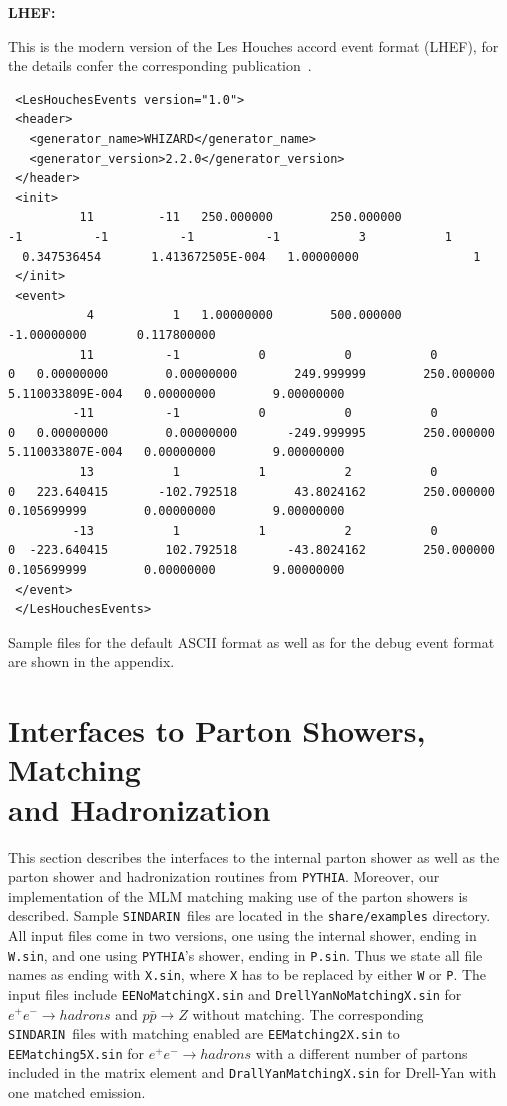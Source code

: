 \documentclass[12pt]{book}
\newcommand{\ttt}[1]{\texttt{#1}}
\newcommand{\pythia}{\texttt{PYTHIA}}
\newcommand{\sindarin}{\texttt{SINDARIN}}
\begin{document}
{\bf LHEF:}

This is the modern version of the Les Houches accord event format
(LHEF), for the details confer the corresponding publication~\cite{LHEF}.

\begin{scriptsize}
  \begin{verbatim}
 <LesHouchesEvents version="1.0">
 <header>
   <generator_name>WHIZARD</generator_name>
   <generator_version>2.2.0</generator_version>
 </header>
 <init>
          11         -11   250.000000        250.000000               -1          -1          -1          -1           3           1
  0.347536454       1.413672505E-004   1.00000000                1
 </init>
 <event>
           4           1   1.00000000        500.000000       -1.00000000       0.117800000
          11          -1           0           0           0           0   0.00000000        0.00000000        249.999999        250.000000       5.110033809E-004   0.00000000        9.00000000
         -11          -1           0           0           0           0   0.00000000        0.00000000       -249.999995        250.000000       5.110033807E-004   0.00000000        9.00000000
          13           1           1           2           0           0   223.640415       -102.792518        43.8024162        250.000000       0.105699999        0.00000000        9.00000000
         -13           1           1           2           0           0  -223.640415        102.792518       -43.8024162        250.000000       0.105699999        0.00000000        9.00000000
 </event>
 </LesHouchesEvents> 
  \end{verbatim}
\end{scriptsize}

Sample files for the default ASCII format as well as for the debug
event format are shown in the appendix. 


\section[Interfaces to Parton Showers, Matching and Hadronization]{Interfaces to Parton Showers, Matching\\and Hadronization}

This section describes the interfaces to the internal parton shower as well as the parton shower and hadronization routines from \pythia. Moreover, our implementation of the MLM matching making use of the parton showers is described. Sample \sindarin\ files are located in the \ttt{share/examples} directory. 
All input files come in two versions, one using the internal shower, ending in \ttt{W.sin}, and one using \pythia's shower, ending in \ttt{P.sin}. Thus we state all file names as ending with \ttt{X.sin}, where \ttt{X} has to be replaced by either \ttt{W} or \ttt{P}.
The input files include \ttt{EENoMatchingX.sin} and \ttt{DrellYanNoMatchingX.sin} for $e^+ e^- \to hadrons$ and $p\bar{p} \to Z$ without matching. The corresponding \sindarin\ files with matching enabled are \ttt{EEMatching2X.sin} to \ttt{EEMatching5X.sin} for $e^+ e^- \to hadrons$ with a different number of partons included in the matrix element and \ttt{DrallYanMatchingX.sin} for Drell-Yan with one matched emission. 
\end{document}
